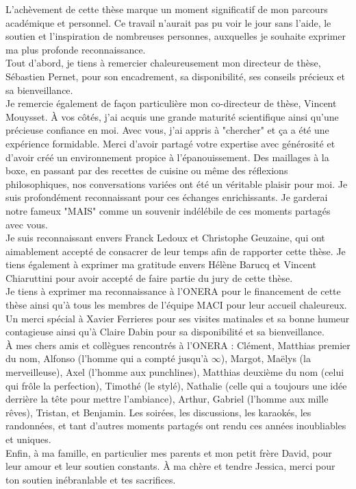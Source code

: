 L’achèvement de cette thèse marque un moment significatif de mon parcours académique et personnel. Ce travail n’aurait pas pu voir le jour sans l’aide, le soutien et l’inspiration de nombreuses personnes, auxquelles je souhaite exprimer ma plus profonde reconnaissance.\\

Tout d'abord, je tiens à remercier chaleureusement mon directeur de thèse, Sébastien Pernet, pour son encadrement, sa disponibilité, ses conseils précieux et sa bienveillance.\\

Je remercie également de façon particulière mon co-directeur de thèse, Vincent Mouysset. À vos côtés, j'ai acquis une grande maturité scientifique ainsi qu'une précieuse confiance en moi. Avec vous, j'ai appris à "chercher" et ça a été une expérience formidable. Merci d’avoir partagé votre expertise avec générosité et d’avoir créé un environnement propice à l’épanouissement. Des maillages à la boxe, en passant par des recettes de cuisine ou même des réflexions philosophiques, nos conversations variées ont été un véritable plaisir pour moi. Je suis profondément reconnaissant pour ces échanges enrichissants. Je garderai notre fameux "MAIS" comme un souvenir indélébile de ces moments partagés avec vous.\\

Je suis reconnaissant envers Franck Ledoux et Christophe Geuzaine, qui ont aimablement accepté de consacrer de leur temps afin de rapporter cette thèse. Je tiens également à exprimer ma gratitude envers Hélène Barucq et Vincent Chiaruttini pour avoir accepté de faire partie du jury de cette thèse.\\

Je tiens à exprimer ma reconnaissance à l'ONERA pour le financement de cette thèse ainsi qu’à tous les membres de l'équipe MACI pour leur accueil chaleureux. Un merci spécial à Xavier Ferrieres pour ses visites matinales et sa bonne humeur contagieuse ainsi qu'à Claire Dabin pour sa disponibilité et sa bienveillance.\\

À mes chers amis et collègues rencontrés à l'ONERA : Clément, Matthias premier du nom, Alfonso (l'homme qui a compté jusqu'à $\infty$), Margot, Maëlys (la merveilleuse), Axel (l'homme aux punchlines), Matthias deuxième du nom (celui qui frôle la perfection), Timothé (le stylé), Nathalie (celle qui a toujours une idée derrière la tête pour mettre l'ambiance), Arthur, Gabriel (l'homme aux mille rêves), Tristan, et Benjamin. Les soirées, les discussions, les karaokés, les randonnées, et tant d'autres moments partagés ont rendu ces années inoubliables et uniques.\\

Enfin, à ma famille, en particulier mes parents et mon petit frère David, pour leur amour et leur soutien constants. À ma chère et tendre Jessica, merci pour ton soutien inébranlable et tes sacrifices.

